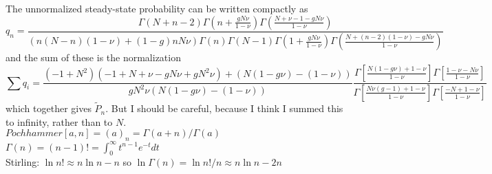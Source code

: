 The unnormalized steady-state probability can be written compactly as%
\begin{equation*}
q_n = \frac{ \Gamma(N+n-2) \Gamma\left(n+\frac{g N\nu}{1-\nu}\right) \Gamma\left(\frac{N+\nu-1-g N\nu}{1-\nu}\right) }{ (n(N-n)(1-\nu)+(1-g)n N\nu) \Gamma(n) \Gamma(N-1) \Gamma\left(1+\frac{g N\nu}{1-\nu}\right) \Gamma\left(\frac{N+(n-2)(1-\nu)-g N\nu}{1-\nu}\right)}
\end{equation*}
and the sum of these is the normalization
\begin{equation*}
\sum q_i = \frac{(-1 + N^2) (-1 + N + \nu - g N \nu + g N^2 \nu) + (N (1 - g \nu) - (1 - \nu))}{g N^2 \nu (N (1 - g \nu) - (1 - \nu))}
 \frac{\Gamma[\frac{N(1-g\nu) + 1-\nu}{1-\nu}]\Gamma[\frac{1 - \nu - N\nu}{1-\nu}]}{\Gamma[\frac{N\nu(g-1)+1-\nu}{1-\nu}]\Gamma[\frac{-N+1-\nu}{1-\nu}]}
\end{equation*}
which together gives $\widetilde{P}_n$. But I should be careful, because I think I summed this to infinity, rather than to $N$. \\
$Pochhammer[a,n] = (a)_n = \Gamma(a+n)/\Gamma(a)$ \\
$\Gamma(n) = (n-1)! = \int_0^\infty t^{n-1}e^{-t}dt$ \\
Stirling: $\ln n! \approx n \ln n - n$ so $\ln \Gamma(n) = \ln n!/n \approx n\ln n - 2n$ \\
